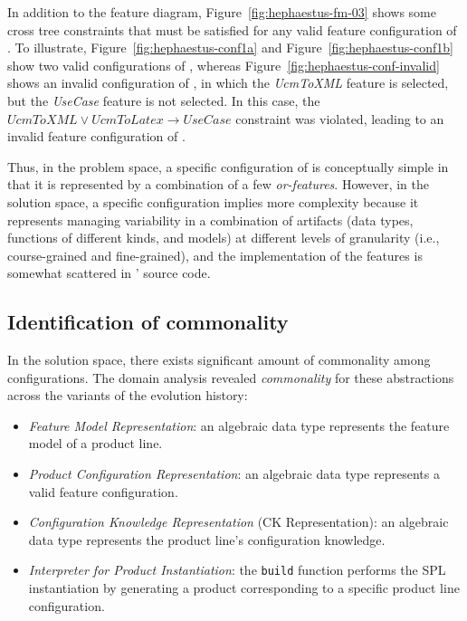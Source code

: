 
In addition to the feature diagram, Figure~\ref{fig:hephaestus-fm-03} shows some cross tree constraints that must be satisfied for any valid feature configuration of \hpl.  To illustrate, Figure~\ref{fig:hephaestus-conf1a} and Figure~\ref{fig:hephaestus-conf1b} show two valid configurations of \hpl, whereas Figure~\ref{fig:hephaestus-conf-invalid} shows an invalid configuration of \hpl, in which the \emph{UcmToXML} feature is selected, but the \emph{UseCase} feature is not selected. In this case, the $UcmToXML \lor UcmToLatex \rightarrow Use Case$ constraint was violated, leading to an invalid feature configuration of \hpl.

Thus, in the problem space, a specific configuration of \hp{} is conceptually simple in that it is represented by a combination of a few \textit{or-features}. However, in the solution space, a specific configuration implies more complexity because it represents managing variability in a combination of artifacts (data types, functions of different kinds, and models) at different levels of granularity (i.e., course-grained and fine-grained), and the implementation of the features is somewhat scattered in \hp' source code.


\subsection{Identification of commonality} 
\label{commonality}

In the solution space, there exists significant amount of commonality among configurations. 
The domain analysis revealed \emph{commonality} for these abstractions across the variants of the evolution history:

\begin{itemize}

\item \emph{Feature Model Representation}: an algebraic data type represents the feature model of a product line.
  
\item \emph{Product Configuration Representation}: an algebraic data type represents a valid feature configuration.

\item \emph{Configuration Knowledge Representation} (CK Representation): an algebraic data type represents the product line's configuration knowledge.

\item \emph{Interpreter for Product Instantiation}: the \texttt{build} function performs the SPL instantiation by generating a product corresponding to a specific product line configuration.

\end{itemize}


